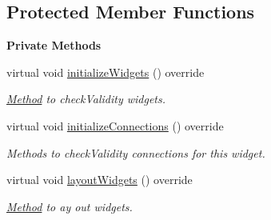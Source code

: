 \subsection*{Protected Member Functions}
\begin{Indent}\textbf{ Private Methods}\par
\begin{DoxyCompactItemize}
\item 
\mbox{\label{classrev_1_1_view_1_1_component_widget_aa42cb25b210e22f04afd7b9acaea55ae}} 
virtual void \mbox{\hyperlink{classrev_1_1_view_1_1_component_widget_aa42cb25b210e22f04afd7b9acaea55ae}{initialize\+Widgets}} () override
\begin{DoxyCompactList}\small\item\em \mbox{\hyperlink{struct_method}{Method}} to check\+Validity widgets. \end{DoxyCompactList}\item 
\mbox{\label{classrev_1_1_view_1_1_component_widget_a36295605699a0f1290a88a00bb1332fe}} 
virtual void \mbox{\hyperlink{classrev_1_1_view_1_1_component_widget_a36295605699a0f1290a88a00bb1332fe}{initialize\+Connections}} () override
\begin{DoxyCompactList}\small\item\em Methods to check\+Validity connections for this widget. \end{DoxyCompactList}\item 
\mbox{\label{classrev_1_1_view_1_1_component_widget_a35035871e2bbd461b4a6a0542b8b27fc}} 
virtual void \mbox{\hyperlink{classrev_1_1_view_1_1_component_widget_a35035871e2bbd461b4a6a0542b8b27fc}{layout\+Widgets}} () override
\begin{DoxyCompactList}\small\item\em \mbox{\hyperlink{struct_method}{Method}} to ay out widgets. \end{DoxyCompactList}\end{DoxyCompactItemize}
\end{Indent}
